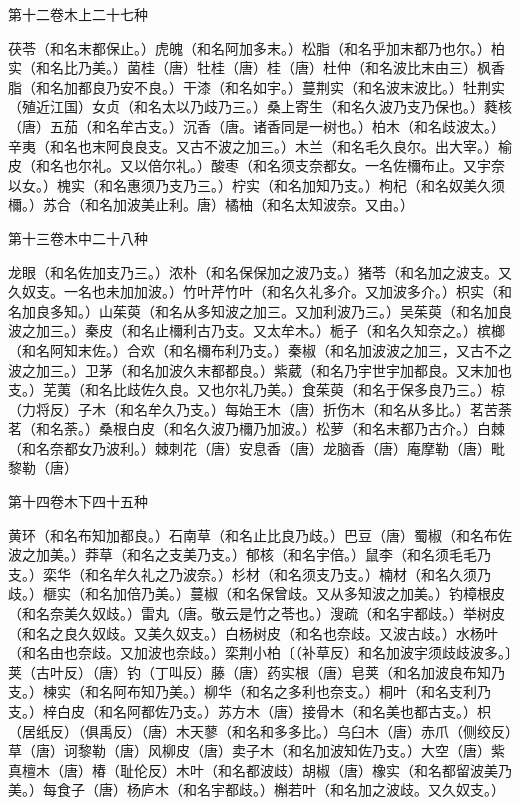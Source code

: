 \documentclass[a4paper,12pt,UTF8,twoside]{ctexbook}
\begin{document}
第十二卷木上二十七种

茯苓（和名末都保止。）虎魄（和名阿加多末。）松脂（和名乎加末都乃也尔。）柏实（和名比乃美。）菌桂（唐）牡桂（唐）桂（唐）杜仲（和名波比末由三）枫香脂（和名加都良乃安不良。）干漆（和名如宇。）蔓荆实（和名波末波比。）牡荆实（殖近江国）女贞（和名太以乃歧乃三。）桑上寄生（和名久波乃支乃保也。）蕤核（唐）五茄（和名牟古支。）沉香（唐。诸香同是一树也。）柏木（和名歧波太。）辛夷（和名也末阿良良支。又古不波之加三。）木兰（和名毛久良尔。出大宰。）榆皮（和名也尔礼。又以倍尔礼。）酸枣（和名须支奈都女。一名佐檷布止。又宇奈以女。）槐实（和名惠须乃支乃三。）柠实（和名加知乃支。）枸杞（和名奴美久须檷。）苏合（和名加波美止利。唐）橘柚（和名太知波奈。又由。）

第十三卷木中二十八种

龙眼（和名佐加支乃三。）浓朴（和名保保加之波乃支。）猪苓（和名加之波支。又久奴支。一名也未加加波。）竹叶芹竹叶（和名久礼多介。又加波多介。）枳实（和名加良多知。）山茱萸（和名从多知波之加三。又加利波乃三。）吴茱萸（和名加良波之加三。）秦皮（和名止檷利古乃支。又太牟木。）栀子（和名久知奈之。）槟榔（和名阿知末佐。）合欢（和名檷布利乃支。）秦椒（和名加波波之加三，又古不之波之加三。）卫茅（和名加波久末都都良。）紫葳（和名乃宇世宇加都良。又末加也支。）芜荑（和名比歧佐久良。又也尔礼乃美。）食茱萸（和名于保多良乃三。）椋（力将反）子木（和名牟久乃支。）每始王木（唐）折伤木（和名从多比。）茗苦荼茗（和名荼。）桑根白皮（和名久波乃檷乃加波。）松萝（和名末都乃古介。）白棘（和名奈都女乃波利。）棘刺花（唐）安息香（唐）龙脑香（唐）庵摩勒（唐）毗黎勒（唐）

第十四卷木下四十五种

黄环（和名布知加都良。）石南草（和名止比良乃歧。）巴豆（唐）蜀椒（和名布佐波之加美。）莽草（和名之支美乃支。）郁核（和名宇倍。）鼠李（和名须毛毛乃支。）栾华（和名牟久礼之乃波奈。）杉材（和名须支乃支。）楠材（和名久须乃歧。）榧实（和名加倍乃美。）蔓椒（和名保曾歧。又从多知波之加美。）钓樟根皮（和名奈美久奴歧。）雷丸（唐。敬云是竹之苓也。）溲疏（和名宇都歧。）举树皮（和名之良久奴歧。又美久奴支。）白杨树皮（和名也奈歧。又波古歧。）水杨叶（和名由也奈歧。又加波也奈歧。）栾荆小柏〔（补草反）和名加波宇须歧歧波多。〕荚（古叶反）（唐）钓（丁叫反）藤（唐）药实根（唐）皂荚（和名加波良布知乃支。）楝实（和名阿布知乃美。）柳华（和名之多利也奈支。）桐叶（和名支利乃支。）梓白皮（和名阿都佐乃支。）苏方木（唐）接骨木（和名美也都古支。）枳（居纸反）（俱禹反）（唐）木天蓼（和名和多多比。）乌臼木（唐）赤爪（侧绞反）草（唐）诃黎勒（唐）风柳皮（唐）卖子木（和名加波知佐乃支。）大空（唐）紫真檀木（唐）椿（耻伦反）木叶（和名都波歧）胡椒（唐）橡实（和名都留波美乃美。）每食子（唐）杨庐木（和名宇都歧。）槲若叶（和名加之波歧。又久奴支。）
\end{document}
